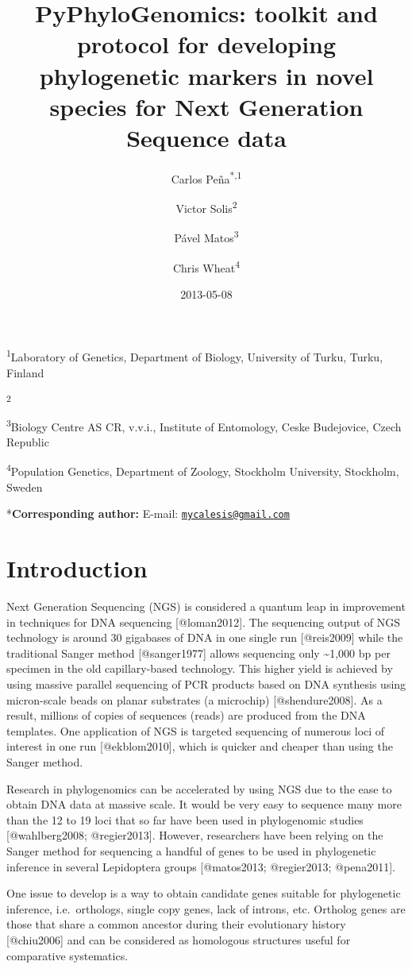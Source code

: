 \documentclass[]{article}
\title{PyPhyloGenomics: toolkit and protocol for developing phylogenetic
       markers in novel species for Next Generation Sequence data}
\author{Carlos Peña\textsuperscript{*,1} \and Victor Solis\textsuperscript{2} \and Pável Matos\textsuperscript{3} \and Chris Wheat\textsuperscript{4}}
\date{2013-05-08}
\begin{document}
\maketitle

\textsuperscript{1}Laboratory of Genetics, Department of Biology,
University of Turku, Turku, Finland

\textsuperscript{2}

\textsuperscript{3}Biology Centre AS CR, v.v.i., Institute of
Entomology, Ceske Budejovice, Czech Republic

\textsuperscript{4}Population Genetics, Department of Zoology, Stockholm
University, Stockholm, Sweden

*\textbf{Corresponding author:} E-mail:
\href{mailto:mycalesis@gmail.com}{\texttt{mycalesis@gmail.com}}

\section{Introduction}

Next Generation Sequencing (NGS) is considered a quantum leap in
improvement in techniques for DNA sequencing {[}@loman2012{]}. The
sequencing output of NGS technology is around 30 gigabases of DNA in one
single run {[}@reis2009{]} while the traditional Sanger method
{[}@sanger1977{]} allows sequencing only \textasciitilde{}1,000 bp per
specimen in the old capillary-based technology. This higher yield is
achieved by using massive parallel sequencing of PCR products based on
DNA synthesis using micron-scale beads on planar substrates (a
microchip) {[}@shendure2008{]}. As a result, millions of copies of
sequences (reads) are produced from the DNA templates. One application
of NGS is targeted sequencing of numerous loci of interest in one run
{[}@ekblom2010{]}, which is quicker and cheaper than using the Sanger
method.

Research in phylogenomics can be accelerated by using NGS due to the
ease to obtain DNA data at massive scale. It would be very easy to
sequence many more than the 12 to 19 loci that so far have been used in
phylogenomic studies {[}@wahlberg2008; @regier2013{]}. However,
researchers have been relying on the Sanger method for sequencing a
handful of genes to be used in phylogenetic inference in several
Lepidoptera groups {[}@matos2013; @regier2013; @pena2011{]}.

One issue to develop is a way to obtain candidate genes suitable for
phylogenetic inference, i.e.~orthologs, single copy genes, lack of
introns, etc. Ortholog genes are those that share a common ancestor
during their evolutionary history {[}@chiu2006{]} and can be considered
as homologous structures useful for comparative systematics.
\end{document}
